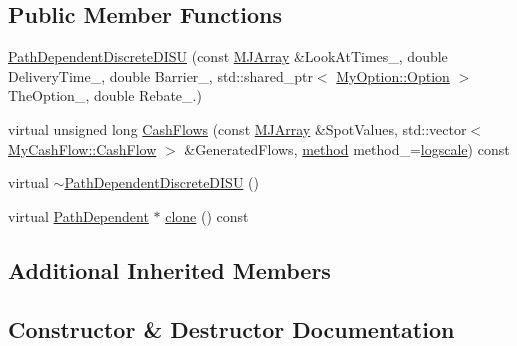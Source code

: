 \subsection*{Public Member Functions}
\begin{DoxyCompactItemize}
\item 
\hyperlink{classPathDependentDiscreteDISU_a08b470a3149025681a73a3cececd0e7e}{Path\+Dependent\+Discrete\+D\+I\+SU} (const \hyperlink{classMJArray}{M\+J\+Array} \&Look\+At\+Times\+\_\+, double Delivery\+Time\+\_\+, double Barrier\+\_\+, std\+::shared\+\_\+ptr$<$ \hyperlink{classMyOption_1_1Option}{My\+Option\+::\+Option} $>$ The\+Option\+\_\+, double Rebate\+\_.)
\item 
virtual unsigned long \hyperlink{classPathDependentDiscreteDISU_ae2b805e66651705392b95f57acc08fff}{Cash\+Flows} (const \hyperlink{classMJArray}{M\+J\+Array} \&Spot\+Values, std\+::vector$<$ \hyperlink{classMyCashFlow_1_1CashFlow}{My\+Cash\+Flow\+::\+Cash\+Flow} $>$ \&Generated\+Flows, \hyperlink{PathDependent_8h_abed946c62f140eb7ff2ac742e6ad9497}{method} method\+\_\+=\hyperlink{PathDependent_8h_abed946c62f140eb7ff2ac742e6ad9497a064d3d3358889658ce07fe9f3191d1fd}{logscale}) const
\item 
virtual \hyperlink{classPathDependentDiscreteDISU_a57c5a31b75c99336d91faf9da92de5be}{$\sim$\+Path\+Dependent\+Discrete\+D\+I\+SU} ()
\item 
virtual \hyperlink{classPathDependent}{Path\+Dependent} $\ast$ \hyperlink{classPathDependentDiscreteDISU_afb23c79ccf3bb133ea5b56be1dbd61e8}{clone} () const
\end{DoxyCompactItemize}
\subsection*{Additional Inherited Members}


\subsection{Constructor \& Destructor Documentation}
\hypertarget{classPathDependentDiscreteDISU_a08b470a3149025681a73a3cececd0e7e}{}\label{classPathDependentDiscreteDISU_a08b470a3149025681a73a3cececd0e7e} 
